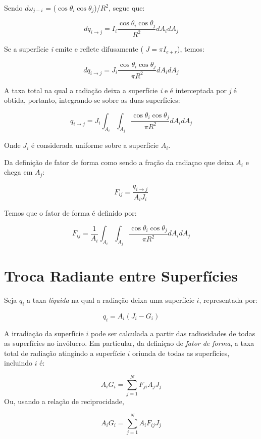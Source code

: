 \documentclass[12pt,a4paper]{article}
\begin{document}
Sendo $d\omega _{j-i}$ = ($\cos\theta_{i}\cos\theta_{j}$)/$R^{2}$, segue que:

\[dq_{i \rightarrow j} = I_{i}\frac{\cos\theta_{i}\cos\theta_{j}}{R^{2}}dA_{i}dA_{j} \]

Se a superfície \textit{i} emite e reflete difusamente ( $J = \pi I_{e+r}$), temos:

\[
	dq_{i \rightarrow j} = J_{i}\frac{\cos\theta_{i}\cos\theta_{j}}{\pi R^{2}}dA_{i}dA_{j} 
\]

A taxa total na qual a radiação deixa a superfície \textit{i} e é interceptada por \textit{j} é obtida, portanto, integrando-se sobre as duas superfícies:

\[
	q_{i \rightarrow j} = J_{i} \int _{A_{i}} \int _{A_{j}} \frac{\cos\theta_{i}\cos\theta_{j}}{\pi R^{2}}dA_{i}dA_{j} 
\] 

Onde $J_{i}$ é considerada uniforme sobre a superfície $A_{i}$.

Da definição de fator de forma como sendo a fração da radiaçao que deixa $A_{i}$ e chega em $A_{j}$:

\[F_{ij}=\frac{q_{i \rightarrow j}}{A_{i}J_{i}}\]

Temos que o fator de forma é definido por:

\[
	F_{ij} = \frac{1}{A_{i}} \int _{A_{i}} \int _{A_{j}} \frac{\cos\theta_{i}\cos\theta_{j}}{\pi R^{2}}dA_{i}dA_{j} 
\] 

\pagebreak

\section{Troca Radiante entre Superfícies}
Seja $q_{i}$ a taxa \textit{líquida} na qual a radiação deixa uma superfície $i$, representada por:

\begin{equation}
q_{i}=A_{i}(J_{i}-G_{i})
\label{eq:1}
\end{equation}

A irradiação da superfície $i$ pode ser calculada a partir das radiosidades de todas as superfícies no invólucro. Em particular, da definiçao de \textit{fator de forma}, a taxa total de radiação atingindo a superfície $i$ oriunda de todas as superfícies, incluindo $i$ é:

\[A_{i}G_{i}=\sum _{j=1}^{N}{F_{ji}A_{j}J_{j}}\]
Ou, usando a relação de reciprocidade, 

\begin{equation}
A_{i}G_{i}=\sum _{j=1}^{N}{A_{i}F_{ij}J_{j}}
\label{eq:2}
\end{equation}
\end{document}
